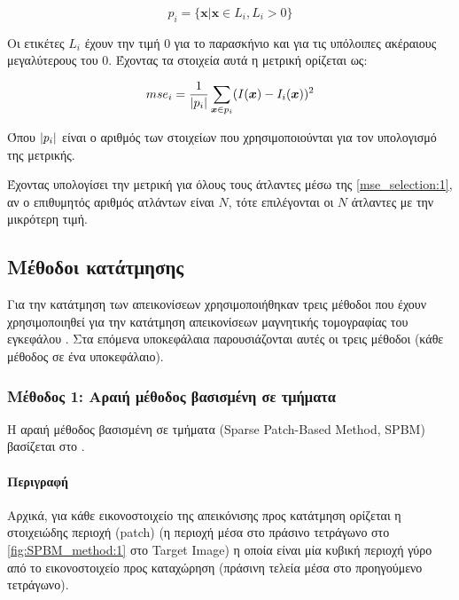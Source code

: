 \documentclass[a4paper,12pt]{article}
\newcommand{\paragraphLine}[1]{\paragraph{#1}\mbox{}}
\DeclarePairedDelimiter\abs{\lvert}{\rvert}
\begin{document}
\begin{equation*}
    p_i = \{\bm{x}| \bm{x} \in L_i, L_i > 0 \}
\end{equation*}

Οι ετικέτες $L_i$ έχουν την τιμή $0$ για το παρασκήνιο και για τις υπόλοιπες
ακέραιους μεγαλύτερους του $0$. Έχοντας τα στοιχεία αυτά η μετρική ορίζεται ως:

\begin{equation} \label{mse_selection:1}
    mse_i = \frac {1} {\abs{p_i}} \sum_{\bm{x} \in p_i} ( I(\bm{x}) -
                I_i(\bm{x})  )^2
\end{equation}

Όπου $\abs{p_i}$ είναι ο αριθμός των στοιχείων που χρησιμοποιούνται για τον
υπολογισμό της μετρικής.

Έχοντας υπολογίσει την μετρική για όλους τους άτλαντες μέσω της
\eqref{mse_selection:1}, αν ο επιθυμητός αριθμός ατλάντων είναι $N$, τότε
επιλέγονται οι $N$ άτλαντες με την μικρότερη τιμή.


\subsection{Μέθοδοι κατάτμησης}

Για την κατάτμηση των απεικονίσεων χρησιμοποιήθηκαν τρεις μέθοδοι που έχουν
χρησιμοποιηθεί για την κατάτμηση απεικονίσεων μαγνητικής τομογραφίας του
εγκεφάλου \cite{Zhang:1} \cite{Tong:1} \cite{Coupe:1}. Στα επόμενα υποκεφάλαια
παρουσιάζονται αυτές οι τρεις μέθοδοι (κάθε μέθοδος σε ένα υποκεφάλαιο).

\subsubsection{Μέθοδος 1: Αραιή μέθοδος βασισμένη σε τμήματα} \label{SPBM:1}

Η αραιή μέθοδος βασισμένη σε τμήματα (Sparse Patch-Based Method, SPBM) βασίζεται
στο \cite{Zhang:1}. 

\paragraphLine{Περιγραφή}

Αρχικά, για κάθε εικονοστοιχείο της απεικόνισης προς κατάτμηση ορίζεται η
στοιχειώδης περιοχή (patch) (η περιοχή μέσα στο πράσινο τετράγωνο στο
\autoref{fig:SPBM_method:1} στο Target Image) η οποία είναι μία κυβική περιοχή
γύρο από το εικονοστοιχείο προς καταχώρηση (πράσινη τελεία μέσα στο προηγούμενο
τετράγωνο).
\end{document}
